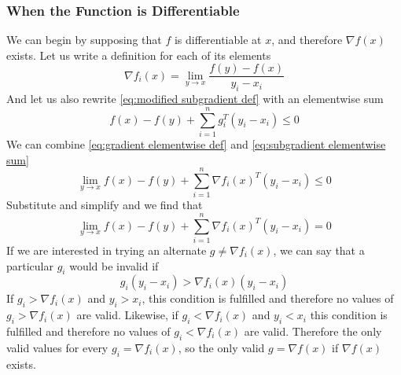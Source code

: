 \documentclass[conference]{IEEEtran}
\DeclareMathOperator{\dom}{dom}
\begin{document}
\subsubsection{When the Function is Differentiable}
We can begin by supposing that \(f\) is differentiable at \(x\), and therefore \(\nabla f(x)\) exists. Let us write a definition for each of its elements
\begin{equation}\label{eq:gradient elementwise def}
    \nabla f_i(x) = \lim_{y \rightarrow x} \frac{f(y)-f(x)}{y_i-x_i}
\end{equation}
And let us also rewrite \eqref{eq:modified subgradient def} with an elementwise sum
\begin{equation}\label{eq:subgradient elementwise sum}
f(x) - f(y)+ \sum^{n}_{i=1} g^T_i(y_i-x_i) \leq 0
\end{equation}
We can combine \eqref{eq:gradient elementwise def} and \eqref{eq:subgradient elementwise sum}
\begin{equation}
\lim_{y \rightarrow x} f(x) - f(y)+ \sum^{n}_{i=1} \nabla f_i(x)^T(y_i-x_i) \leq 0
\end{equation}
Substitute and simplify and we find that
\begin{equation}
\lim_{y \rightarrow x} f(x) - f(y)+ \sum^{n}_{i=1} \nabla f_i(x)^T(y_i-x_i) = 0
\end{equation}
If we are interested in trying an alternate \(g \neq \nabla f_i(x)\), we can say that a particular \(g_i\) would be invalid if
\begin{equation}\label{eq:differentiable cookie}
g_i(y_i-x_i) > \nabla f_i(x)(y_i-x_i)
\end{equation}
If \(g_i > \nabla f_i(x)\) and \(y_i > x_i\), this condition is fulfilled and therefore no values of \(g_i > \nabla f_i(x)\) are valid. Likewise, if \(g_i < \nabla f_i(x)\) and \(y_i < x_i\) this condition is fulfilled and therefore no values of \(g_i < \nabla f_i(x)\) are valid. Therefore the only valid values for every \(g_i = \nabla f_i(x)\), so the only valid \(g = \nabla f(x)\) if \(\nabla f(x)\) exists.

\end{document}
